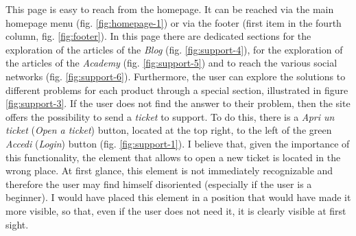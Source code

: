 This page is easy to reach from the homepage. It can be reached via the 
main homepage menu (fig. \ref{fig:homepage-1}) or via the footer (first 
item in the fourth column, fig. \ref{fig:footer}). In this page there are 
dedicated sections for the exploration of the articles of the \textit{Blog} 
(fig. \ref{fig:support-4}), for the exploration of the articles of the 
\textit{Academy} (fig. \ref{fig:support-5}) and to reach the various 
social networks (fig. \ref{fig:support-6}). Furthermore, the user can 
explore the solutions to different problems for each product through a 
special section, illustrated in figure \ref{fig:support-3}. If the user 
does not find the answer to their problem, then the site offers the 
possibility to send a \textit{ticket} to support. To do this, there is a 
\textit{Apri un ticket} (\textit{Open a ticket}) button, located at the 
top right, to the left of the green \textit{Accedi} (\textit{Login}) 
button (fig. \ref{fig:support-1}). I believe that, given the importance 
of this functionality, the element that allows to open a new ticket is 
located in the wrong place. At first glance, this element is not 
immediately recognizable and therefore the user may find himself 
disoriented (especially if the user is a beginner). I would have placed 
this element in a position that would have made it more visible, so 
that, even if the user does not need it, it is clearly visible at first 
sight. 